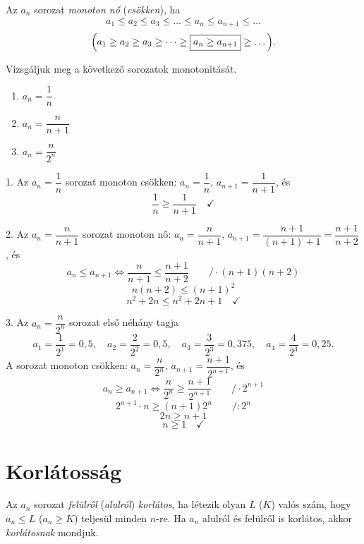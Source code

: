\documentclass[11pt]{article}
\begin{document}
\begin{defbox}
\begin{definition}
Az $a_{n}$ sorozat \emph{monoton nő} (\emph{csökken}), ha
\[
a_{1}\le a_{2}\le a_{3}\le\dots\le\boxed{a_{n}\le a_{n+1}}\le\dots
\]
\[
\Bigl(a_{1}\ge a_{2}\ge a_{3}\ge\dots\ge\boxed{a_{n}\ge a_{n+1}}\ge\dots\Bigr).
\]
\end{definition}
\end{defbox}

\begin{exbox}
\begin{example}
Vizsgáljuk meg a következő sorozatok monotonitását.
\begin{enumerate}[label=\arabic*., itemsep=6pt]
\item $a_{n}=\dfrac{1}{n}$
\item $a_{n}=\dfrac{n}{n+1}$
\item $a_{n}=\dfrac{n}{2^{n}}$
\end{enumerate}
\end{example}
\end{exbox}
\begin{solution}
1. Az $a_{n}=\dfrac{1}{n}$ sorozat monoton csökken: $a_{n}=\dfrac{1}{n}$, $a_{n+1}=\dfrac{1}{n+1}$, és
\[
\frac{1}{n}\ge\frac{1}{n+1}\quad\checkmark
\]

2. Az $a_{n}=\dfrac{n}{n+1}$ sorozat monoton nő: $a_{n}=\dfrac{n}{n+1}$,
$a_{n+1}=\dfrac{n+1}{(n+1)+1}=\dfrac{n+1}{n+2}$, és
\[
a_{n}\le a_{n+1}
\iff \frac{n}{n+1}\le\frac{n+1}{n+2}\qquad \Big/\cdot (n+1)(n+2)
\]
\[
n(n+2)\le (n+1)^{2}
\]
\[
n^{2}+2n\le n^{2}+2n+1\quad\checkmark
\]

3. Az $a_{n}=\dfrac{n}{2^{n}}$ sorozat első néhány tagja
\[
a_{1}=\frac{1}{2^{1}}=0,5,\quad
a_{2}=\frac{2}{2^{2}}=0,5,\quad
a_{3}=\frac{3}{2^{3}}=0,375,\quad
a_{4}=\frac{4}{2^{4}}=0,25 .
\]
A sorozat monoton csökken: $a_{n}=\dfrac{n}{2^{n}}$, $a_{n+1}=\dfrac{n+1}{2^{n+1}}$, és
\[
a_{n}\ge a_{n+1}
\iff \frac{n}{2^{n}}\ge\frac{n+1}{2^{n+1}}\qquad \Big/\cdot 2^{n+1}
\]
\[
2^{n+1}\cdot n\ge (n+1)2^{n}\qquad \Big/ :2^{n}
\]
\[
2n\ge n+1
\]
\[
n\ge 1\quad\checkmark
\]
\end{solution}

\section{Korlátosság}

\begin{defbox}
\begin{definition}
Az $a_{n}$ sorozat \emph{felülről} (\emph{alulról}) \emph{korlátos}, ha létezik olyan $L$ ($K$) valós szám, hogy $a_{n}\le L$ ($a_{n}\ge K$) teljesül minden $n$-re. Ha $a_{n}$ alulról és felülről is korlátos, akkor \emph{korlátosnak} mondjuk.
\end{definition}
\end{defbox}
\end{document}
